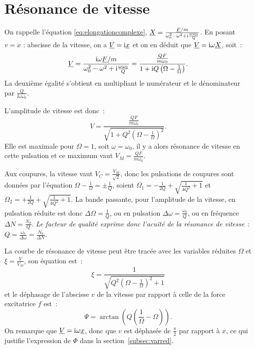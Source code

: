 \section{Résonance de vitesse}%

On rappelle l'équation \eqref{eq:elongationcomplexe}, \(\underline{X} =
\frac{\underline{F}/m}{\omega_0^2-\omega^2+\mathrm{i}\frac{\omega\omega_0}{Q}}\). En posant \(v 
=%
\dot{x}\) : abscisse de la vitesse, on a \(\underline{V} = \mathrm{i} \underline{x}\) et on en déduit 
que%
\(\underline{V} = \mathrm{i}\omega \underline{X}\), soit~:
\begin{equation}%
  \Vitc = \frac{\ii\omega 
  \Fc/m}{\omega_0^2-\omega^2+\ii\frac{\omega\omega_0}{Q}}
  = \frac{\frac{QF}{m\omega_0}}{1+\ii Q\left(\Omega-\frac{1}{\Omega}\right)}.
\end{equation}%
La deuxième égalité s'obtient en multipliant le numérateur et le dénominateur
par \(\frac{Q}{\ii\omega\omega_0}\).

L'amplitude de vitesse est donc~:
\begin{equation}%
  V =
  \frac{\frac{QF}{m\omega_0}}{\sqrt{1+Q^2\left(\Omega-\frac{1}{\Omega}\right)^2}}.
\end{equation}%
Elle est maximale pour \(\Omega = 1\), soit \(\omega = \omega_0\), il y a alors
résonance de vitesse en cette pulsation et ce maximum vaut \(V_M =
\frac{QF}{m\omega_0}\).%

Aux coupures, la vitesse vaut \(V_C = \frac{V_M}{\sqrt{2}}\), donc les
pulsations de coupures sont données par l'équation \(\Omega - \frac{1}{\Omega} 
=
\pm \frac{1}{Q}\), soient \(\Omega_1 = -\frac{1}{2Q} + 
\sqrt{\frac{1}{4Q^2}+1}\)
et \(\Omega_2 = +\frac{1}{2Q} + \sqrt{\frac{1}{4Q^2}+1}\). La bande passante,
pour l'amplitude de la vitesse, en pulsation réduite est donc \(\Delta\Omega =
\frac{1}{Q}\), ou en pulsation \(\Delta\omega = \frac{\omega_0}{Q}\), ou en%
fréquence \(\Delta N = \frac{N_0}{Q}\). \emph{Le facteur de qualité exprime 
donc
l'acuité de la résonance de vitesse}~: \(Q = \frac{\omega_0}{\Delta\omega} =
\frac{N_0}{\Delta N}\).%

La courbe de résonance de vitesse peut être tracée avec les variables réduites
\(\Omega\) et \(\xi = \frac{V}{V_M}\), son équation est~:
\begin{equation}%
  \xi = \frac{1}{\sqrt{Q^2\left(\Omega - \frac{1}{\Omega}\right)^2 + 1}}
\end{equation}%
et le déphasage de l'abscisse \(v\) de la vitesse par rapport à celle de la
force excitatrice \(f\) est~:
\begin{equation}%
  \Psi = \arctan\left(Q\left(\frac{1}{\Omega} - \Omega\right)\right).
\end{equation}%
On remarque que \(\underline{V} = \mathrm{i}\omega \underline{x}\), donc que \(v\) est déphasée de
\(\frac{\pi}{2}\) par rapport à \(x\), ce qui justifie l'expression de \(\Phi\)
dans la section~\ref{subsec:varred}.

